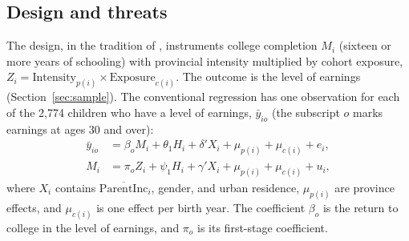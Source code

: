 \documentclass[11pt]{article}
\newcommand{\pinc}{\overline{\mathrm{ParentInc}}}
\begin{document}
\subsection{Design and threats}
\label{sec:design}

The design, in the tradition of \citet{Duflo2001}, instruments college completion $M_i$ (sixteen or more years
of schooling) with provincial intensity multiplied by cohort exposure,
$Z_i = \mathrm{Intensity}_{p(i)} \times \mathrm{Exposure}_{c(i)}$. The outcome is the level of earnings (Section~\ref{sec:sample}). The conventional regression has one observation for each of the 2,774 children who have a level of earnings, $\bar y_{io}$ (the subscript $o$ marks earnings at ages 30 and over):
\begin{equation}
\begin{aligned}
\bar y_{io} &= \beta_o M_i + \theta_1 H_i + \delta' X_i + \mu_{p(i)} + \mu_{c(i)} + e_{i}, \\
M_i &= \pi_o Z_i + \psi_1 H_i + \gamma' X_i + \mu_{p(i)} + \mu_{c(i)} + u_i,
\end{aligned}
\label{eq:oldonly}
\end{equation}
where $X_i$ contains $\pinc_i$, gender, and urban residence, $\mu_{p(i)}$ are province
effects, and $\mu_{c(i)}$ is one effect per birth year. The coefficient $\beta_o$ is the return to college in the level of earnings, and $\pi_o$ is its first-stage coefficient.
\end{document}

